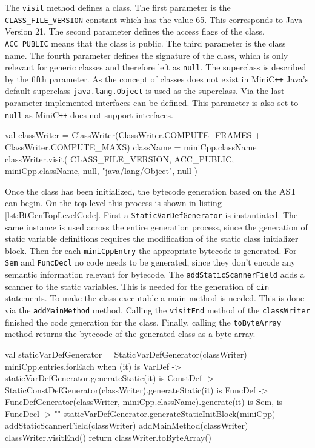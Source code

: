 The \verb|visit| method defines a class. The first parameter is the \verb|CLASS_FILE_VERSION| constant which has the value 65. This corresponds to Java Version 21. The second parameter defines the access flags of the class. \verb|ACC_PUBLIC| means that the class is public. The third parameter is the class name. The fourth parameter defines the signature of the class, which is only relevant for generic classes and therefore left as \verb|null|. The superclass is described by the fifth parameter. As the concept of classes does not exist in MiniC\verb|++| Java's default superclass \verb|java.lang.Object| is used as the superclass. Via the last parameter implemented interfaces can be defined. This parameter is also set to \verb|null| as MiniC\verb|++| does not support interfaces.

\begin{KotlinCode}[float,numbers=none,caption=Code for the definition of a class., label=lst:BtGenClassDef]
val classWriter = ClassWriter(ClassWriter.COMPUTE_FRAMES + ClassWriter.COMPUTE_MAXS)
className = miniCpp.className
classWriter.visit(
    CLASS_FILE_VERSION,
    ACC_PUBLIC,
    miniCpp.className,
    null,
    "java/lang/Object",
    null
)
\end{KotlinCode}


Once the class has been initialized, the bytecode generation based on the AST can begin. On the top level this process is shown in listing \ref{lst:BtGenTopLevelCode}. First a \verb|StaticVarDefGenerator| is instantiated. The same instance is used across the entire generation process, since the generation of static variable definitions requires the modification of the static class initializer block. Then for each \verb|miniCppEntry| the appropriate bytecode is generated. For \verb|Sem| and \verb|FuncDecl| no code needs to be generated, since they don't encode any semantic information relevant for bytecode. The \verb|addStaticScannerField| adds a scanner to the static variables. This is needed for the generation of \verb|cin| statements. To make the class executable a main method is needed. This is done via the \verb|addMainMethod| method. Calling the \verb|visitEnd| method of the \verb|classWriter| finished the code generation for the class. Finally, calling the \verb|toByteArray| method returns the bytecode of the generated class as a byte array. 

\begin{KotlinCode}[float,numbers=none,caption=Top-level code for the bytecode generation., label=lst:BtGenTopLevelCode]
val staticVarDefGenerator = StaticVarDefGenerator(classWriter)
miniCpp.entries.forEach {
    when (it) {
        is VarDef -> staticVarDefGenerator.generateStatic(it)
        is ConstDef -> StaticConstDefGenerator(classWriter).generateStatic(it)
        is FuncDef -> FuncDefGenerator(classWriter, miniCpp.className).generate(it)
        is Sem, is FuncDecl -> ""
    }
}
staticVarDefGenerator.generateStaticInitBlock(miniCpp)
addStaticScannerField(classWriter)
addMainMethod(classWriter)
classWriter.visitEnd()
return classWriter.toByteArray()
\end{KotlinCode}

